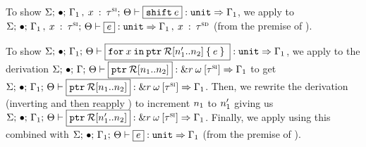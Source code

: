 \begin{preservation}
{    To show $\oxtypjudge{\oxglobalctx}{\oxemptyctx}{\oxkontctx}{
      \oxextendctx{\oxvarctx_1}{
        \oxvarctxentry{\oxid}{\oxsitype}
      }
    }{\oxshift{\oxexpr}}{\oxtunit}{\oxvarctx_1}$, we apply  to
    $\oxtypjudge{\oxglobalctx}{\oxemptyctx}{\oxkontctx}{
      \oxextendctx{\oxvarctx_1}{
        \oxvarctxentry{\oxid}{\oxsitype}
      }
    }{\oxexpr}{\oxtunit}{
      \oxextendctx{\oxvarctx_1}{
        \oxvarctxentry{\oxid}{\oxsdtype}
      }
    }$ (from the premise of ).

    To show $\oxtypjudge{\oxglobalctx}{\oxemptyctx}{\oxkontctx}{\oxvarctx_1}{
      \oxfor{\oxid}{\oxsliceptr{\oxreferent}{\oxnum_1^\prime}{\oxnum_2}}{\oxexpr}
    }{\oxtunit}{\oxvarctx_1}$, we apply
     to the derivation
    $\oxtypjudge{\oxglobalctx}{\oxemptyctx}{\oxkontctx}{\oxvarctx}
    {\oxsliceptr{\oxreferent}{\oxnum_1}{\oxnum_2}}{
      \oxtref{\oxcprov}{\oxmuta}{\oxtslice{\oxsitype}}
    }{\oxvarctx_1}$
    to get $\oxtypjudge{\oxglobalctx}{\oxemptyctx}{\oxkontctx}{\oxvarctx_1}
    {\oxsliceptr{\oxreferent}{\oxnum_1}{\oxnum_2}}{
      \oxtref{\oxcprov}{\oxmuta}{\oxtslice{\oxsitype}}
    }{\oxvarctx_1}$. Then, we rewrite the derivation (inverting and then reapply
    ) to increment $n_1$ to $n_1^\prime$ giving us
    $\oxtypjudge{\oxglobalctx}{\oxemptyctx}{\oxkontctx}{\oxvarctx_1}
    {\oxsliceptr{\oxreferent}{\oxnum_1^\prime}{\oxnum_2}}{
      \oxtref{\oxcprov}{\oxmuta}{\oxtslice{\oxsitype}}
    }{\oxvarctx_1}$.
    Finally, we apply  using this combined with
    $\oxtypjudge{\oxglobalctx}{\oxemptyctx}{\oxkontctx}{\oxvarctx_1}
    {\oxexpr}{\oxtunit}{\oxvarctx_1}$ (from the premise of ).
  }


\end{preservation}



